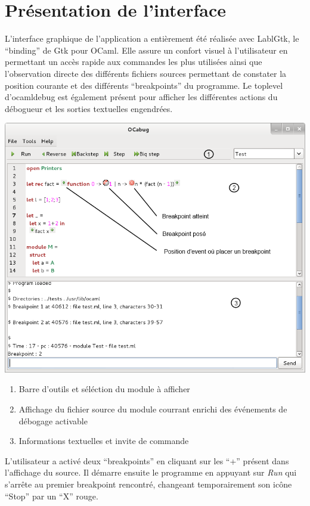 \documentclass[11pt,a4paper]{report}
\begin{document}

\section{Présentation de l'interface}

L'interface graphique de l'application a entièrement été réalisée avec LablGtk, le ``binding'' de Gtk pour OCaml.
Elle assure un confort visuel à l'utilisateur en permettant un accès rapide aux commandes les plus utilisées ainsi
que l'observation directe des différents fichiers sources permettant de constater la position courante 
et des différents ``breakpoints'' du programme. Le toplevel d'ocamldebug est également présent pour afficher
les différentes actions du débogueur et les sorties textuelles engendrées.

\includegraphics{screen_exec}

\begin{enumerate}
\item Barre d'outils et séléction du module à afficher
\item Affichage du fichier source du module courrant enrichi des événements de débogage activable
\item Informations textuelles et invite de commande
\end{enumerate}

L'utilisateur a activé deux ``breakpoints'' en cliquant sur les ``+'' présent dans l'affichage du source.
Il démarre ensuite le programme en appuyant sur \emph{Run} qui s'arrête au premier breakpoint rencontré,
changeant temporairement son icône ``Stop'' par un ``X'' rouge.
\end{document}
